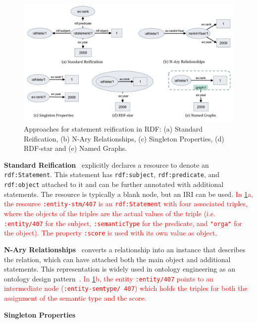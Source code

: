 \begin{figure}[t]
\centering
\includegraphics[width=\linewidth]{figures/chp2_reifications.pdf}
\caption[Approaches for statement reification in RDF]{Approaches for statement reification in RDF: (a) Standard Reification, (b) N-Ary Relationships, (c) Singleton Properties, (d) RDF-star and (e) Named Graphs.}
\label{fig:chp2_reification}
\end{figure}

\noindent\textbf{Standard Reification}~\cite{lassila1999rdf} explicitly declares a resource to denote an \texttt{rdf:Statement}.
This statement has \texttt{rdf:subject}, \texttt{rdf:predicate}, and \texttt{rdf:object} attached to it and can be further annotated with additional statements. The resource is typically a blank node, but an IRI can be used. \textcolor{red}{In \cref{fig:chp2_reification}a, the resource \texttt{:entity-stm/407} is an \texttt{rdf:Statement} with four associated triples, where the objects of the triples are the actual values of the triple (i.e. \texttt{:entity/407} for the subject, \texttt{:semanticType} for the predicate, and \texttt{"orga"} for the object). The property \texttt{:score} is used with its own value as object.}


\noindent\textbf{N-Ary Relationships}~\cite{naryw3c2006} converts a relationship into an instance that describes the relation, which can have attached both the main object and additional statements.
This representation is widely used in ontology engineering as an ontology design pattern~\cite{gangemi2013multi}.\textcolor{red}{ In \cref{fig:chp2_reification}b, the entity \texttt{:entity/407} points to an intermediate node (\texttt{:entity-semtype/ 407}) which holds the triples for both the assignment of the semantic type and the score.}

\noindent\textbf{Singleton Properties}~\cite{nguyen2014don}


